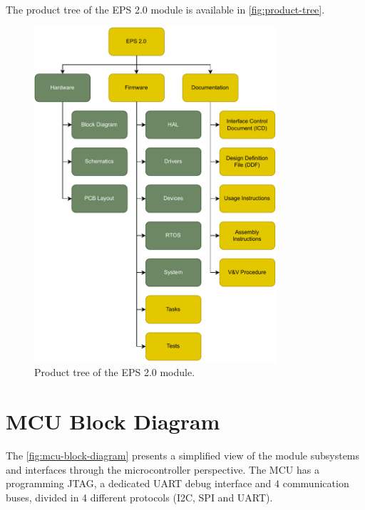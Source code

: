 The product tree of the EPS 2.0 module is available in \autoref{fig:product-tree}.

\begin{figure}[!ht]
    \begin{center}
        \includegraphics[width=0.8\textwidth]{figures/product-tree.pdf}
        \caption{Product tree of the EPS 2.0 module.}
        \label{fig:product-tree}
    \end{center}
\end{figure}

\section{MCU Block Diagram}

The \autoref{fig:mcu-block-diagram} presents a simplified view of the module subsystems and interfaces through the microcontroller perspective. 
The MCU has a programming JTAG, a dedicated UART debug interface and 4 communication buses, divided in 4 different protocols (I2C, SPI and UART). 

